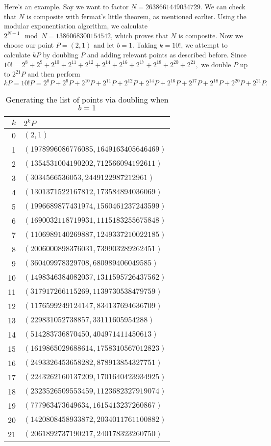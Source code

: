 Here's an example.
Say we want to factor $N = 2638661449034729$.
We can check that $N$ is composite with fermat's little theorem, as mentioned earlier.
Using the modular exponentiation algorithm, we calculate $2^{N-1} \mod N = 1386068300154542$, which proves that $N$ is composite.
Now we choose our point $P = (2,1)$ and let $b = 1$.
Taking $k=10!$, we attempt to calculate $kP$ by doubling $P$ and adding relevant points as described before.
Since $10! = 2^{8} + 2^{9} + 2^{10} + 2^{11} + 2^{12} + 2^{14} + 2^{16} + 2^{17} + 2^{18} + 2^{20} + 2^{21},$ we double $P$ up to $2^{21}P$ and then perform
$$kP = 10!P = 2^{8}P + 2^{9}P + 2^{10}P + 2^{11}P + 2^{12}P + 2^{14}P + 2^{16}P + 2^{17}P + 2^{18}P + 2^{20}P + 2^{21}P.$$
\begin{table}[htbp]
	\centering
	\begin{tabular}{r|l}
		$k$ & $2^k P$\\
		\hline
		0 & $(2, 1)$\\
		1 & $(1978996086776085, 1649163405646469)$\\
		2 & $(1354531004190202, 712566094192611)$\\
		3 & $(3034566536053, 2449122987212961)$\\
		4 & $(1301371522167812, 173584894036069)$\\
		5 & $(1996689877431974, 1560461237243599)$\\
		6 & $(1690032118719931, 1115183255675848)$\\
		7 & $(1106989140269887, 1249337210022185)$\\
		8 & $(2006000898376031, 739903289262451)$\\
		9 & $(360409978329708, 680989406049585)$\\
		10 & $(1498346384082037, 1311595726437562)$\\
		11 & $(317917266115269, 1139730538479759)$\\
		12 & $(1176599249124147, 834137694636709)$\\
		13 & $(229831052738857, 33111605954288)$\\
		14 & $(514283736870450, 404971411450613)$\\
		15 & $(1619865029688614, 1758310567012823)$\\
		16 & $(2493326453658282, 878913854327751)$\\
		17 & $(2243262160137209, 1701640423934925)$\\
		18 & $(2323526509553459, 1123682327919074)$\\
		19 & $(777963473649634, 1615413237260867)$\\
		20 & $(1420808458933872, 2034011761100882)$\\
		21 & $(2061892737190217, 240178323260750)$
	\end{tabular}
	\caption{Generating the list of points via doubling when $b=1$}
	\label{unsuccessfuldouble}
\end{table}
